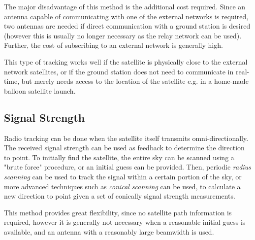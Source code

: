 The major disadvantage of this method is the additional cost required. Since an antenna capable of communicating with one of the external networks is required, two antennas are needed if direct communication with a ground station is desired (however this is usually no longer necessary as the relay network can be used). Further, the cost of subscribing to an external network is generally high.

This type of tracking works well if the satellite is physically close to the external network satellites, or if the ground station does not need to communicate in real-time, but merely needs access to the location of the satellite e.g. in a home-made balloon satellite launch.

\subsection{Signal Strength}
Radio tracking can be done when the satellite itself transmits omni-directionally. The received signal strength can be used as feedback to determine the direction to point. To initially find the satellite, the entire sky can be scanned using a "brute force" procedure, or an initial guess can be provided. Then, periodic \textit{radius scanning} can be used to track the signal within a certain portion of the sky, or more advanced techniques such as \textit{conical scanning} can be used, to calculate a new direction to point given a set of conically signal strength measurements.

This method provides great flexibility, since no satellite path information is required, however it is generally not necessary when a reasonable initial guess is available, and an antenna with a reasonably large beamwidth is used.
